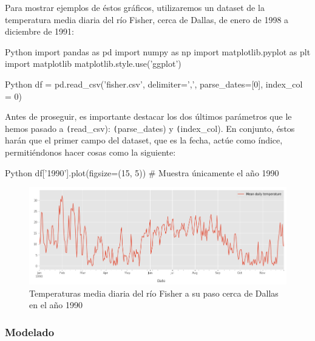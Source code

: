 Para mostrar ejemplos de éstos gráficos, utilizaremos un dataset de la
temperatura media diaria del río Fisher, cerca de Dallas, de enero de 1998 a
diciembre de 1991:

\vspace{0.5cm}
\begin{TMcode}{Python}{}{}
import pandas as pd
import numpy as np
import matplotlib.pyplot as plt
import matplotlib
matplotlib.style.use('ggplot')
\end{TMcode}

\begin{TMcode}{Python}{}{}
df = pd.read_csv('fisher.csv', delimiter=',', parse_dates=[0], index_col = 0)
\end{TMcode}
\vspace{0.5cm}

Antes de proseguir, es importante destacar los dos últimos parámetros que le
hemos pasado a \texttt(read\_csv): \texttt(parse\_dates) y \texttt(index\_col). En
conjunto, éstos harán que el primer campo del dataset, que es la
fecha, actúe como índice, permitiéndonos hacer cosas como la siguiente:

\vspace{0.5cm}
\begin{TMcode}{Python}{}{}
  df['1990'].plot(figsize=(15, 5)) # Muestra únicamente el año 1990
\end{TMcode}

\begin{figure}[ht]
  \centering
  \includegraphics[scale=0.50]{img/yearPlot.png}
  \caption{\label{fig:yearPlot} Temperaturas media diaria del río Fisher a su
    paso cerca de Dallas en el año 1990}
\end{figure}

\subsubsection{Modelado}
\label{subsec:state_dataScience_workflow_modeling}

